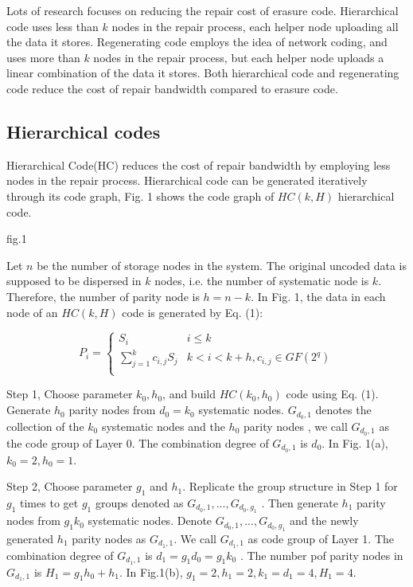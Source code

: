 \documentclass{article} %
\begin{document}
Lots of research focuses on reducing the repair cost of erasure code. Hierarchical code uses less than $k$ nodes in the repair process, each helper node uploading all the data it stores. Regenerating code employs the idea of network coding, and uses more than $k$ nodes in the repair process, but each helper node uploads a linear combination of the data it stores. Both hierarchical code and regenerating code reduce the cost of repair bandwidth compared to erasure code.

\subsection{Hierarchical codes}
Hierarchical Code(HC) reduces the cost of repair bandwidth by employing less nodes in the repair process. Hierarchical code can be generated iteratively through its code graph, Fig. 1 shows the code graph of $HC(k, H)$ hierarchical code.

fig.1

Let $n$ be the number of storage nodes in the system. The original uncoded data is supposed to be dispersed in $k$ nodes, i.e. the number of systematic node is $k$. Therefore, the number of parity node is $h = n - k$. In Fig. 1, the data in each node of an $HC(k, H)$ code is generated by Eq. (1):

\begin{equation}
P_i = \left\{
\begin{array}{cc}
S_i & i \le k \\
\sum_{j=1}^kc_{i, j}S_j & k < i < k + h, c_{i, j} \in GF(2^q)\\
\end{array}
\right.
\end{equation}

Step 1, Choose parameter  $k_0, h_0$,  and build $HC(k_0 , h_0)$ code using Eq. (1). Generate $h_0$  parity nodes from $d_0 = k_0$  systematic nodes. $G_{d_0, 1}$  denotes the collection of the $k_0$ systematic nodes and the $h_0$ parity nodes , we call $G_{d_0, 1}$  as the code group of Layer 0. The combination degree of $G_{d_0, 1}$  is $d_0$. In Fig. 1(a), $k_0 = 2, h_0 = 1$.

Step 2, Choose parameter $g_1$ and $h_1$. Replicate the group structure in Step 1 for $g_1$  times to get  $g_1$ groups denoted as $G_{d_0, 1}, ..., G_{d_0, g_1}$ . Then generate $h_1$ parity nodes from $g_1k_0$  systematic nodes. Denote $G_{d_0, 1}, ..., G_{d_0, g_1}$ and the newly generated $h_1$  parity nodes as $G_{d_1, 1}$. We call $G_{d_1, 1}$  as code group of Layer 1. The combination degree of $G_{d_1, 1}$  is $d_1 = g_1d_0 = g_1k_0$ . The number pof parity nodes in $G_{d_1, 1}$ is $H_1 = g_1h_0 + h_1$. In Fig.1(b), $g_1 = 2, h_1 = 2, k_1 = d_1 = 4, H_1 = 4$.
\end{document}
